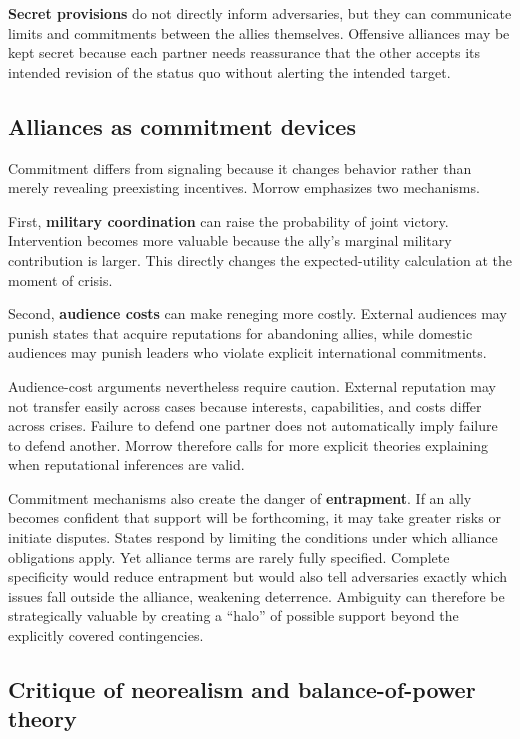 \textbf{Secret provisions} do not directly inform adversaries, but they can communicate limits and commitments between the allies themselves. Offensive alliances may be kept secret because each partner needs reassurance that the other accepts its intended revision of the status quo without alerting the intended target.

\subsection{Alliances as commitment devices}

Commitment differs from signaling because it changes behavior rather than merely revealing preexisting incentives. Morrow emphasizes two mechanisms.

First, \textbf{military coordination} can raise the probability of joint victory. Intervention becomes more valuable because the ally's marginal military contribution is larger. This directly changes the expected-utility calculation at the moment of crisis.

Second, \textbf{audience costs} can make reneging more costly. External audiences may punish states that acquire reputations for abandoning allies, while domestic audiences may punish leaders who violate explicit international commitments.

Audience-cost arguments nevertheless require caution. External reputation may not transfer easily across cases because interests, capabilities, and costs differ across crises. Failure to defend one partner does not automatically imply failure to defend another. Morrow therefore calls for more explicit theories explaining when reputational inferences are valid.

Commitment mechanisms also create the danger of \textbf{entrapment}. If an ally becomes confident that support will be forthcoming, it may take greater risks or initiate disputes. States respond by limiting the conditions under which alliance obligations apply. Yet alliance terms are rarely fully specified. Complete specificity would reduce entrapment but would also tell adversaries exactly which issues fall outside the alliance, weakening deterrence. Ambiguity can therefore be strategically valuable by creating a ``halo'' of possible support beyond the explicitly covered contingencies.

\subsection{Critique of neorealism and balance-of-power theory}

